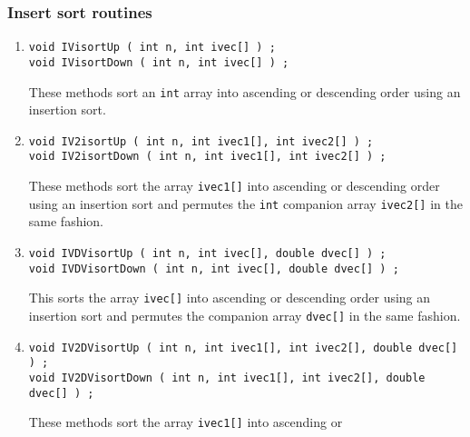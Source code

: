 \subsubsection{Insert sort routines}
\label{subsubsection:Utilities:proto:sort:insert}
\par
\begin{enumerate}
\item
\begin{verbatim}
void IVisortUp ( int n, int ivec[] ) ;
void IVisortDown ( int n, int ivec[] ) ;
\end{verbatim}
These methods sort an {\tt int} array into ascending or descending
order using an insertion sort.
\item
\begin{verbatim}
void IV2isortUp ( int n, int ivec1[], int ivec2[] ) ;
void IV2isortDown ( int n, int ivec1[], int ivec2[] ) ;
\end{verbatim}
These methods sort the array {\tt ivec1[]} into ascending or
descending order using an insertion sort and permutes 
the {\tt int} companion array {\tt ivec2[]} in the same fashion.
\item
\begin{verbatim}
void IVDVisortUp ( int n, int ivec[], double dvec[] ) ;
void IVDVisortDown ( int n, int ivec[], double dvec[] ) ;
\end{verbatim}
This sorts the array {\tt ivec[]} into ascending or descending order 
using an insertion sort and permutes the companion array {\tt dvec[]}
in the same fashion.
\item
\begin{verbatim}
void IV2DVisortUp ( int n, int ivec1[], int ivec2[], double dvec[] ) ;
void IV2DVisortDown ( int n, int ivec1[], int ivec2[], double dvec[] ) ;
\end{verbatim}
These methods sort the array {\tt ivec1[]} into ascending or

\end{enumerate}
